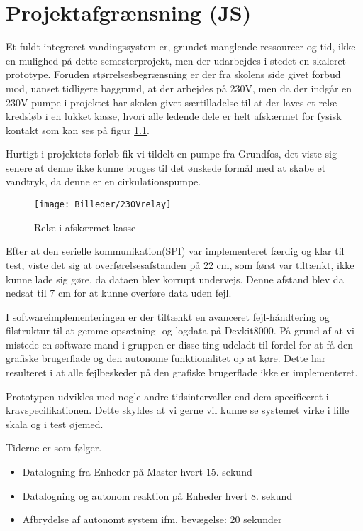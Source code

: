 \chapter{Projektafgrænsning (JS)}

Et fuldt integreret vandingssystem er, grundet manglende ressourcer og tid, ikke en mulighed på dette semesterprojekt, men der udarbejdes i stedet en skaleret prototype.
Foruden størrelsesbegrænsning er der fra skolens side givet forbud mod, uanset tidligere baggrund, at der arbejdes på 230V, men da der indgår en 230V pumpe i projektet har skolen givet særtilladelse til at der laves et relæ-kredsløb i en lukket kasse, hvori alle ledende dele er helt afskærmet for fysisk kontakt som kan ses på figur \ref{lab:230Vrelay}.

Hurtigt i projektets forløb fik vi tildelt en pumpe fra Grundfos, det viste sig senere at denne ikke kunne bruges til det ønskede formål med at skabe et vandtryk, da denne er en cirkulationspumpe. 


\begin{figure}[H]
  \centering
    \texttt{[image: Billeder/230Vrelay]}
    \caption{Relæ i afskærmet kasse}
    \label{lab:230Vrelay}
\end{figure}

Efter at den serielle kommunikation(SPI) var implementeret færdig og klar til test, viste det sig at overførelsesafstanden på 22 cm, som først var tiltænkt, ikke kunne lade sig gøre, da dataen blev korrupt undervejs. Denne afstand blev da nedsat til 7 cm for at kunne overføre data uden fejl.
 
I softwareimplementeringen er der tiltænkt en  avanceret fejl-håndtering og filstruktur til at gemme opsætning- og logdata på Devkit8000. På grund af at vi mistede en software-mand i gruppen er disse ting udeladt til fordel for at få den grafiske brugerflade og den autonome funktionalitet op at køre. Dette har resulteret i at alle fejlbeskeder på den grafiske brugerflade ikke er implementeret.

Prototypen udvikles med nogle andre tidsintervaller end dem specificeret i kravspecifikationen. Dette skyldes at vi gerne vil kunne se systemet virke i lille skala og i test øjemed.

Tiderne er som følger.

\begin{itemize}
	\item Datalogning fra Enheder på Master hvert 15. sekund
	\item Datalogning og autonom reaktion på Enheder hvert 8. sekund
	\item Afbrydelse af autonomt system ifm. bevægelse: 20 sekunder
\end{itemize}